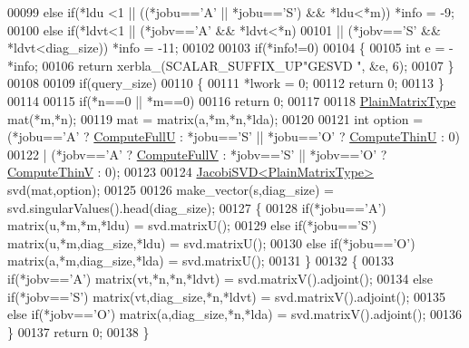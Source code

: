 \begin{DoxyCode}
00099   \textcolor{keywordflow}{else}  \textcolor{keywordflow}{if}(*ldu <1 || ((*jobu==\textcolor{charliteral}{'A'} || *jobu==\textcolor{charliteral}{'S'}) && *ldu<*m))    *info = -9;
00100   \textcolor{keywordflow}{else}  \textcolor{keywordflow}{if}(*ldvt<1 || (*jobv==\textcolor{charliteral}{'A'} && *ldvt<*n)
00101                    || (*jobv==\textcolor{charliteral}{'S'} && *ldvt<diag\_size))            *info = -11;
00102   
00103   \textcolor{keywordflow}{if}(*info!=0)
00104   \{
00105     \textcolor{keywordtype}{int} e = -*info;
00106     \textcolor{keywordflow}{return} xerbla\_(SCALAR\_SUFFIX\_UP\textcolor{stringliteral}{"GESVD "}, &e, 6);
00107   \}
00108   
00109   \textcolor{keywordflow}{if}(query\_size)
00110   \{
00111     *lwork = 0;
00112     \textcolor{keywordflow}{return} 0;
00113   \}
00114   
00115   \textcolor{keywordflow}{if}(*n==0 || *m==0)
00116     \textcolor{keywordflow}{return} 0;
00117   
00118   \hyperlink{group___core___module_class_eigen_1_1_matrix}{PlainMatrixType} mat(*m,*n);
00119   mat = matrix(a,*m,*n,*lda);
00120   
00121   \textcolor{keywordtype}{int} option = (*jobu==\textcolor{charliteral}{'A'} ? \hyperlink{group__enums_ggae3e239fb70022eb8747994cf5d68b4a9a2b4f91ca5859a4159dbfe8090043817f}{ComputeFullU} : *jobu==\textcolor{charliteral}{'S'} || *jobu==\textcolor{charliteral}{'O'} ? 
      \hyperlink{group__enums_ggae3e239fb70022eb8747994cf5d68b4a9af8c742a1aa87773e165eae406c9ccaf8}{ComputeThinU} : 0)
00122              | (*jobv==\textcolor{charliteral}{'A'} ? \hyperlink{group__enums_ggae3e239fb70022eb8747994cf5d68b4a9a52c6f7e80bbf9a42297c88f700245b51}{ComputeFullV} : *jobv==\textcolor{charliteral}{'S'} || *jobv==\textcolor{charliteral}{'O'} ? 
      \hyperlink{group__enums_ggae3e239fb70022eb8747994cf5d68b4a9a1055e53fa95c8ae04a07ebb72cfafd95}{ComputeThinV} : 0);
00123   
00124   \hyperlink{group___s_v_d___module_class_eigen_1_1_jacobi_s_v_d}{JacobiSVD<PlainMatrixType>} svd(mat,option);
00125   
00126   make\_vector(s,diag\_size) = svd.singularValues().head(diag\_size);
00127   \{
00128         \textcolor{keywordflow}{if}(*jobu==\textcolor{charliteral}{'A'}) matrix(u,*m,*m,*ldu)           = svd.matrixU();
00129   \textcolor{keywordflow}{else}  \textcolor{keywordflow}{if}(*jobu==\textcolor{charliteral}{'S'}) matrix(u,*m,diag\_size,*ldu)    = svd.matrixU();
00130   \textcolor{keywordflow}{else}  \textcolor{keywordflow}{if}(*jobu==\textcolor{charliteral}{'O'}) matrix(a,*m,diag\_size,*lda)    = svd.matrixU();
00131   \}
00132   \{
00133         \textcolor{keywordflow}{if}(*jobv==\textcolor{charliteral}{'A'}) matrix(vt,*n,*n,*ldvt)         = svd.matrixV().adjoint();
00134   \textcolor{keywordflow}{else}  \textcolor{keywordflow}{if}(*jobv==\textcolor{charliteral}{'S'}) matrix(vt,diag\_size,*n,*ldvt)  = svd.matrixV().adjoint();
00135   \textcolor{keywordflow}{else}  \textcolor{keywordflow}{if}(*jobv==\textcolor{charliteral}{'O'}) matrix(a,diag\_size,*n,*lda)    = svd.matrixV().adjoint();
00136   \}
00137   \textcolor{keywordflow}{return} 0;
00138 \}
\end{DoxyCode}
